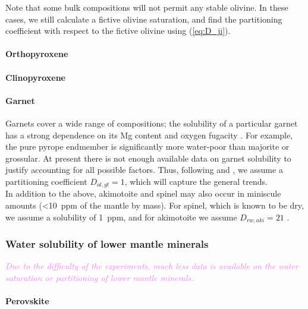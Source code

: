 \documentclass[linenumbers]{aastex631}
\newcommand{\todo}[1]{\textit{\textcolor{violet}{{#1}}}}
\begin{document}
Note that some bulk compositions will not permit any stable olivine. In these cases, we still calculate a fictive olivine saturation, and find the partitioning coefficient with respect to the fictive olivine using (\ref{eq:D_ji}).

\paragraph{Orthopyroxene}

\paragraph{Clinopyroxene}

\paragraph{Garnet} Garnets cover a wide range of compositions; the solubility of a particular garnet has a strong dependence on its Mg content and oxygen fugacity \citep[e.g.,][]{mookherjee_solubility_2010, zhang_effects_2022}. For example, the pure pyrope endmember is significantly more water-poor than majorite or grossular. At present there is not enough available data on garnet solubility to justify accounting for all possible factors. Thus, following \citet{demouchy_distribution_2017} and \citet{andrault_mantle_2022}, we assume a partitioning coefficient $D_{ol, gt} = 1$, which will capture the general trends.  \\

In addition to the above, akimotoite and spinel may also occur in miniscule amounts (\textless 10~ppm of the mantle by mass). For spinel, which is known to be dry, we assume a solubility of 1~ppm, and for akimotoite we assume $D_{rw, aki} = 21$ \citep{keppler_thermodynamics_2006}.

\subsubsection{Water solubility of lower mantle minerals}\label{sec:sat_lm}

\todo{Due to the difficulty of the experiments, much less data is available on the water saturation or partitioning of lower mantle minerals.}

\paragraph{Perovskite}
\end{document}
